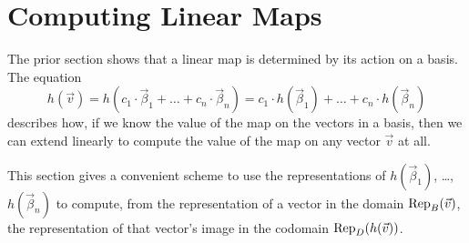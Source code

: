 \section{Computing Linear Maps}
The prior section shows that
a linear map is determined by its action on a basis.
The equation
\begin{equation*}
  h(\vec{v})
  =h(c_1\cdot\vec{\beta}_1+\dots+c_n\cdot\vec{\beta}_n)
  =c_1\cdot h(\vec{\beta}_1)+\dots +c_n\cdot h(\vec{\beta}_n)
\tag*{}\end{equation*}
describes how, 
if we know the value of the map on the vectors in a basis, then we
can extend linearly to 
compute the value of the map on any vector $\vec{v}$ at all.

This section gives a convenient scheme
to use the representations of 
\( h(\vec{\beta}_1) \), \ldots, \( h(\vec{\beta}_n) \)
to compute, from the representation of a vector in the domain 
$\rep{\vec{v}}{B}$,
the representation of that vector's image in the codomain 
$\rep{h(\vec{v})}{D}$.














